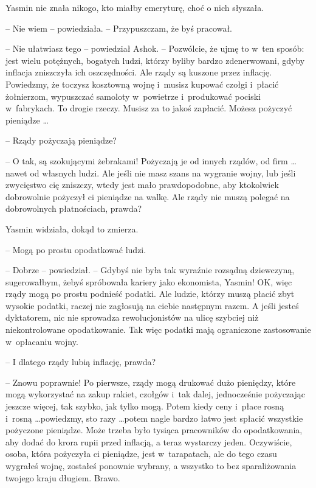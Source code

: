 \documentclass[oneside,polish,11pt,rmheadings]{mwbk}
\begin{document}
Yasmin nie znała nikogo, kto miałby emeryturę, choć o nich słyszała. 

-- Nie wiem -- powiedziała. -- Przypuszczam, że byś pracował.

-- Nie ułatwiasz tego -- powiedział Ashok. -- Pozwólcie, że ujmę to w~ten sposób: jest wielu potężnych, bogatych ludzi, którzy byliby bardzo zdenerwowani, gdyby inflacja zniszczyła ich oszczędności. Ale rządy są kuszone przez inflację. Powiedzmy, że toczysz kosztowną wojnę i~musisz kupować czołgi i~płacić żołnierzom, wypuszczać samoloty w~powietrze i~produkować pociski w~fabrykach. To drogie rzeczy. Musisz za to jakoś zapłacić. Możesz pożyczyć pieniądze \ldots 

-- Rządy pożyczają pieniądze?

-- O tak, są szokującymi żebrakami! Pożyczają je od innych rządów, od firm  \ldots  nawet od własnych ludzi. Ale jeśli nie masz szans na wygranie wojny, lub jeśli zwycięstwo cię zniszczy, wtedy jest mało prawdopodobne, aby ktokolwiek dobrowolnie pożyczył ci pieniądze na walkę. Ale rządy nie muszą polegać na dobrowolnych płatnościach, prawda?

Yasmin widziała, dokąd to zmierza. 

-- Mogą po prostu opodatkować ludzi.

-- Dobrze -- powiedział. -- Gdybyś nie była tak wyraźnie rozsądną dziewczyną, sugerowałbym, żebyś spróbowała kariery jako ekonomista, Yasmin! OK, więc rządy mogą po prostu podnieść podatki. Ale ludzie, którzy muszą płacić zbyt wysokie podatki, raczej nie zagłosują na ciebie następnym razem. A jeśli jesteś dyktatorem, nic nie sprowadza rewolucjonistów na ulicę szybciej niż niekontrolowane opodatkowanie. Tak więc podatki mają ograniczone zastosowanie w~opłacaniu wojny.

-- I dlatego rządy lubią inflację, prawda?

-- Znowu poprawnie! Po pierwsze, rządy mogą drukować dużo pieniędzy, które mogą wykorzystać na zakup rakiet, czołgów i~tak dalej, jednocześnie pożyczając jeszcze więcej, tak szybko, jak tylko mogą. Potem kiedy ceny i~płace rosną i~rosną  \ldots  powiedzmy, sto razy  \ldots  potem nagle bardzo łatwo jest spłacić wszystkie pożyczone pieniądze. Może trzeba było tysiąca pracowników do opodatkowania, aby dodać do krora rupii przed inflacją, a teraz wystarczy jeden. Oczywiście, osoba, która pożyczyła ci pieniądze, jest w~tarapatach, ale do tego czasu wygrałeś wojnę, zostałeś ponownie wybrany, a wszystko to bez sparaliżowania twojego kraju długiem. Brawo.
\end{document}
